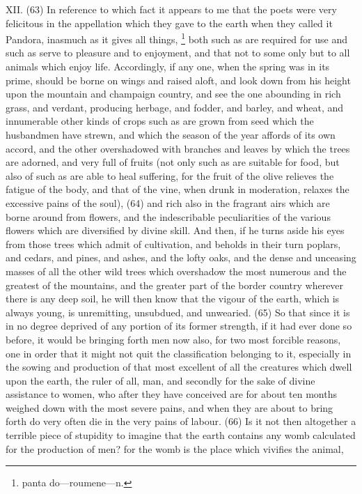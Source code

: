 XII. (63) In reference to which fact it appears to me that the poets were very felicitous in the
appellation which they gave to the earth when they called it Pandora, inasmuch as it gives all
things, \footnote{panta do—roumene—n.} both such as are required for use and such as serve to pleasure and
to enjoyment, and that not to some only but to all animals which enjoy life. Accordingly, if any one,
when the spring was in its prime, should be borne on wings and raised aloft, and look down from his
height upon the mountain and champaign country, and see the one abounding in rich grass, and
verdant, producing herbage, and fodder, and barley, and wheat, and innumerable other kinds of
crops such as are grown from seed which the husbandmen have strewn, and which the season of
the year affords of its own accord, and the other overshadowed with branches and leaves by which
the trees are adorned, and very full of fruits (not only such as are suitable for food, but also of
such as are able to heal suffering, for the fruit of the olive relieves the fatigue of the body, and that
of the vine, when drunk in moderation, relaxes the excessive pains of the soul), (64) and rich also
in the fragrant airs which are borne around from flowers, and the indescribable peculiarities of the
various flowers which are diversified by divine skill. And then, if he turns aside his eyes from those
trees which admit of cultivation, and beholds in their turn poplars, and cedars, and pines, and
ashes, and the lofty oaks, and the dense and unceasing masses of all the other wild trees which
overshadow the most numerous and the greatest of the mountains, and the greater part of the
border country wherever there is any deep soil, he will then know that the vigour of the earth, which
is always young, is unremitting, unsubdued, and unwearied. (65) So that since it is in no degree
deprived of any portion of its former strength, if it had ever done so before, it would be bringing
forth men now also, for two most forcible reasons, one in order that it might not quit the
classification belonging to it, especially in the sowing and production of that most excellent of all the
creatures which dwell upon the earth, the ruler of all, man, and secondly for the sake of divine
assistance to women, who after they have conceived are for about ten months weighed down with
the most severe pains, and when they are about to bring forth do very often die in the very pains of
labour. (66) Is it not then altogether a terrible piece of stupidity to imagine that the earth contains
any womb calculated for the production of men? for the womb is the place which vivifies the animal,
